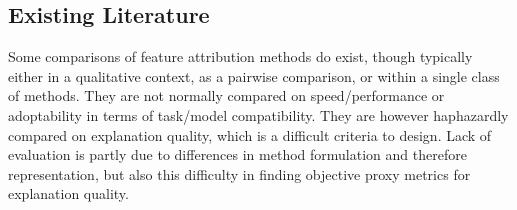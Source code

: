 \documentclass[main]{subfiles}
\begin{document}
\subsection*{Existing Literature}

Some comparisons of feature attribution methods do exist, though typically either in a qualitative context, as a pairwise comparison, or within a single class of methods. They are not normally compared on speed/performance or adoptability in terms of task/model compatibility. They are however haphazardly compared on explanation quality, which is a difficult criteria to design. Lack of evaluation is partly due to differences in method formulation and therefore representation, but also this difficulty in finding objective proxy metrics for explanation quality.  





\end{document}
